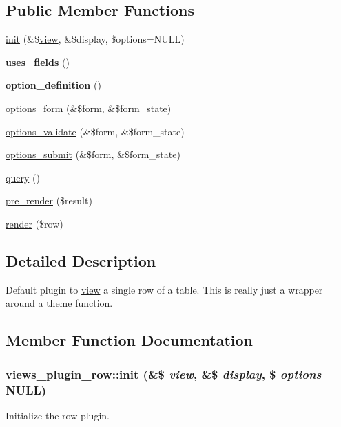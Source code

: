 \subsection*{Public Member Functions}
\begin{DoxyCompactItemize}
\item 
\hyperlink{classviews__plugin__row_abf02e5f51e907c5009edda15d997c161}{init} (\&\$\hyperlink{classview}{view}, \&\$display, \$options=NULL)
\item 
\hypertarget{classviews__plugin__row_a0f855a903177b1cbc5e84c1d5c3cce9a}{
{\bfseries uses\_\-fields} ()}
\label{classviews__plugin__row_a0f855a903177b1cbc5e84c1d5c3cce9a}

\item 
\hypertarget{classviews__plugin__row_aad6be1492eae8605e9aff37da9f19337}{
{\bfseries option\_\-definition} ()}
\label{classviews__plugin__row_aad6be1492eae8605e9aff37da9f19337}

\item 
\hyperlink{classviews__plugin__row_a6914c39d64977a0aa71da39cc1af004e}{options\_\-form} (\&\$form, \&\$form\_\-state)
\item 
\hyperlink{classviews__plugin__row_a32906ab357ff63a5e6ea22d53c3a5e6a}{options\_\-validate} (\&\$form, \&\$form\_\-state)
\item 
\hyperlink{classviews__plugin__row_adce2d15d7f422a48477c6fdf43de80ee}{options\_\-submit} (\&\$form, \&\$form\_\-state)
\item 
\hyperlink{classviews__plugin__row_abfc5a6936d485f19d49cfd9eae094f8f}{query} ()
\item 
\hyperlink{classviews__plugin__row_ae49a23f750874e4b3d294aa3a20ecd64}{pre\_\-render} (\$result)
\item 
\hyperlink{classviews__plugin__row_a8243842e087dd28664b32cef0309f2a6}{render} (\$row)
\end{DoxyCompactItemize}


\subsection{Detailed Description}
Default plugin to \hyperlink{classview}{view} a single row of a table. This is really just a wrapper around a theme function. 

\subsection{Member Function Documentation}
\hypertarget{classviews__plugin__row_abf02e5f51e907c5009edda15d997c161}{
\subsubsection[{init}]{\setlength{\rightskip}{0pt plus 5cm}views\_\-plugin\_\-row::init (\&\$ {\em view}, \/  \&\$ {\em display}, \/  \$ {\em options} = {\ttfamily NULL})}}
\label{classviews__plugin__row_abf02e5f51e907c5009edda15d997c161}
Initialize the row plugin. 

